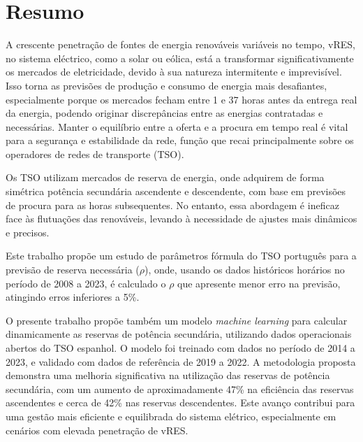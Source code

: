 \chapter{Resumo}
\justifying

A crescente penetração de fontes de energia renováveis variáveis no tempo, vRES, no sistema eléctrico, como a solar ou eólica, está a transformar significativamente os mercados de eletricidade, devido à sua natureza intermitente e imprevisível. Isso torna as previsões de produção e consumo de energia mais desafiantes, especialmente porque os mercados fecham entre 1 e 37 horas antes da entrega real da energia, podendo originar discrepâncias entre as energias contratadas e necessárias. Manter o equilíbrio entre a oferta e a procura em tempo real é vital para a segurança e estabilidade da rede, função que recai principalmente sobre os operadores de redes de transporte (TSO).\par
Os TSO utilizam mercados de reserva de energia, onde adquirem de forma simétrica potência secundária ascendente e descendente, com base em previsões de procura para as horas subsequentes. No entanto, essa abordagem é ineficaz face às flutuações das renováveis, levando à necessidade de ajustes mais dinâmicos e precisos.\par
Este trabalho propõe um estudo de parâmetros fórmula do TSO português para a previsão de reserva necessária ($\rho$), onde, usando os dados históricos horários no período de 2008 a 2023, é calculado o $\rho$ que apresente menor erro na previsão, atingindo erros inferiores a 5\%.\par
O presente trabalho propõe também um modelo \textit{machine learning} para calcular dinamicamente as reservas de potência secundária, utilizando dados operacionais abertos do TSO espanhol. O modelo foi treinado com dados no período de 2014 a 2023, e validado com dados de referência de 2019 a 2022. A metodologia proposta demonstra uma melhoria significativa na utilização das reservas de potência secundária, com um aumento de aproximadamente 47\% na eficiência das reservas ascendentes e cerca de 42\% nas reservas descendentes. Este avanço contribui para uma gestão mais eficiente e equilibrada do sistema elétrico, especialmente em cenários com elevada penetração de vRES.\par




\vspace{0.5cm} %

